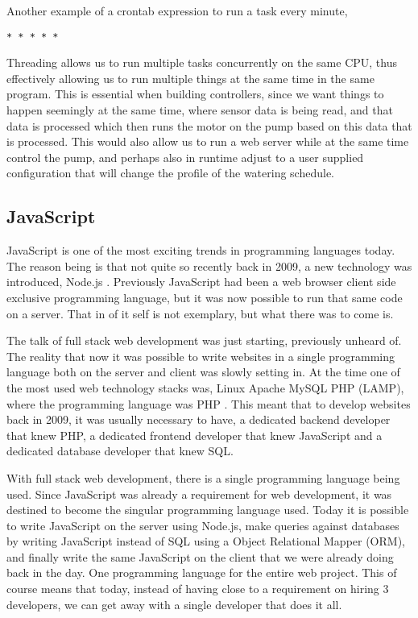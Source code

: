 \documentclass[12pt,a4paper,oneside]{book}
\begin{document}
Another example of a crontab expression to run a task every minute,
\begin{verbatim}
* * * * *
\end{verbatim}

\bigskip

Threading allows us to run multiple tasks concurrently on the same CPU, thus effectively allowing us to run multiple things at the same time in the same program.
This is essential when building controllers, since we want things to happen seemingly at the same time, where sensor data is being read, and that data is processed which then runs the motor on the pump based on this data that is processed.
This would also allow us to run a web server while at the same time control the pump, and perhaps also in runtime adjust to a user supplied configuration that will change the profile of the watering schedule.

\bigskip

\subsection{JavaScript}
JavaScript is one of the most exciting trends in programming languages today.
The reason being is that not quite so recently back in 2009, a new technology was introduced, Node.js \cite{nodejs_release}.
Previously JavaScript had been a web browser client side exclusive programming language, but it was now possible to run that same code on a server. That in of it self is not exemplary, but what there was to come is.

The talk of full stack web development was just starting, previously unheard of. The reality that now it was possible to write websites in a single programming language both on the server and client was slowly setting in. At the time one of the most used web technology stacks was, Linux Apache MySQL PHP (LAMP), where the programming language was PHP \cite{2009_programming}. This meant that to develop websites back in 2009, it was usually necessary to have, a dedicated backend developer that knew PHP, a dedicated frontend developer that knew JavaScript and a dedicated database developer that knew SQL.

With full stack web development, there is a single programming language being used. Since JavaScript was already a requirement for web development, it was destined to become the singular programming language used. Today it is possible to write JavaScript on the server using Node.js, make queries against databases by writing JavaScript instead of SQL using a Object Relational Mapper (ORM), and finally write the same JavaScript on the client that we were already doing back in the day. One programming language for the entire web project. This of course means that today, instead of having close to a requirement on hiring 3 developers, we can get away with a single developer that does it all.
\end{document}

